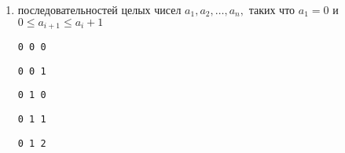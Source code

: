 \documentclass{article}
\begin{document}
\begin{enumerate_boxed}
\begin{enumerate}
            \begin{minipage}{0.18\textwidth}
                \centering
                \texttt{1 1 1}
            \end{minipage}
            \begin{minipage}{0.18\textwidth}
                \centering
                \texttt{1 1 2}
            \end{minipage}
            \begin{minipage}{0.18\textwidth}
                \centering
                \texttt{1 1 3}
            \end{minipage}
            \begin{minipage}{0.18\textwidth}
                \centering
                \texttt{1 2 2}
            \end{minipage}
            \begin{minipage}{0.18\textwidth}
                \centering
                \texttt{1 2 3}
            \end{minipage}

            \item  последовательностей целых чисел $a_1, a_2, \dotsc, a_n,$ таких
            что $a_1 = 0$ и $0 \leqslant a_{i+1} \leqslant a_i + 1$

            \begin{minipage}{0.18\textwidth}
                \centering
                \texttt{0 0 0}
            \end{minipage}
            \begin{minipage}{0.18\textwidth}
                \centering
                \texttt{0 0 1}
            \end{minipage}
            \begin{minipage}{0.18\textwidth}
                \centering
                \texttt{0 1 0}
            \end{minipage}
            \begin{minipage}{0.18\textwidth}
                \centering
                \texttt{0 1 1}
            \end{minipage}
            \begin{minipage}{0.18\textwidth}
                \centering
                \texttt{0 1 2}
            \end{minipage}
        \end{enumerate}
    \end{enumerate_boxed}
\end{document}
